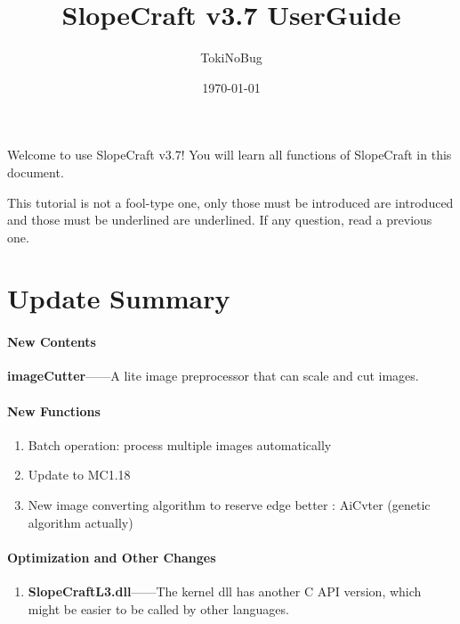 \documentclass{article}
\title{SlopeCraft v3.7 UserGuide}
\author{TokiNoBug}
\date{\today}
\begin{document}
    \maketitle
    Welcome to use SlopeCraft v3.7! You will learn all functions of SlopeCraft in this document.

    This tutorial is not a fool-type one, only those must be introduced are introduced and those must be underlined are underlined. If any question, read a previous one.

    \section{Update Summary}
    \paragraph{New Contents}

    \textbf{imageCutter}——A lite image preprocessor that can scale and cut images.

    \paragraph{New Functions}
    \begin{enumerate}
        \item Batch operation: process multiple images automatically
        \item Update to MC1.18
        \item New image converting algorithm to reserve edge better : AiCvter (genetic algorithm actually)
    \end{enumerate}

    \paragraph{Optimization and Other Changes}
    \begin{enumerate}
        \item \textbf{SlopeCraftL3.dll}——The kernel dll has another C API version, which might be easier to be called by other languages.
    \end{enumerate}
\end{document}
